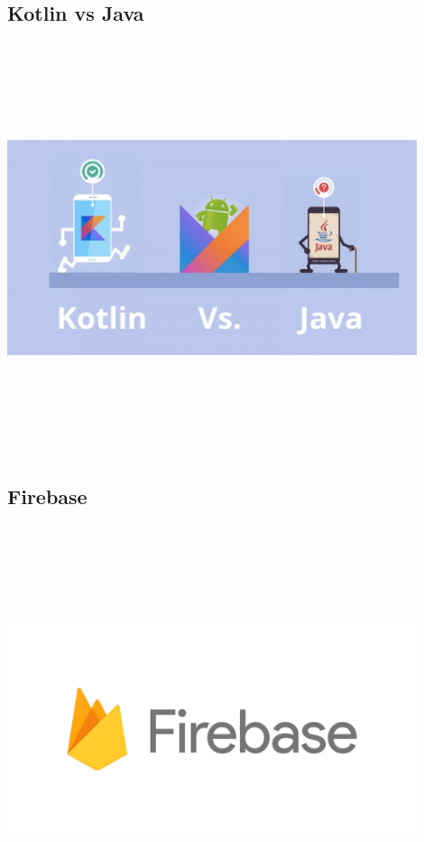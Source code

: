 \subsection{Kotlin vs Java}
\par
\medskip
\begin{center}
    \includegraphics[width=12cm,height=12cm,keepaspectratio]{Images/KotlinvJava.jpg}
\end{center}

\subsection{Firebase}
\par
\medskip
\begin{center}
    \includegraphics[width=12cm,height=12cm,keepaspectratio]{Images/firebase.png}
\end{center}

